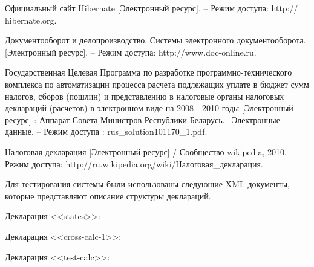 \documentclass[14pt,a4paper]{reportmod}
\begin{document}
\begin{thebibliography}{99}
 Официальный сайт Hibernate  [Электронный ресурс]. -- Режим доступа: http:// hibernate.org.

 Документооборот и делопроизводство. Системы электронного документооборота. [Электронный ресурс]. -- Режим доступа: http://www.doc-online.ru.

 Государственная Целевая Программа по разработке программно-технического комплекса по автоматизации процесса расчета подлежащих уплате в бюджет сумм налогов, сборов (пошлин) и представлению в налоговые органы налоговых деклараций (расчетов) в электронном виде на 2008 - 2010 годы [Электронный ресурс] : Аппарат Совета Министров Республики Беларусь.-- Электронные данные. -- Режим доступа : rus\_solution101170\_1.pdf.

 Налоговая декларация [Электронный ресурс] / Сообщество wikipedia, 2010. -- Режим доступа: http://ru.wikipedia.org/wiki/Налоговая\_декларация.

\end{thebibliography}

Для тестирования системы были использованы следующие XML документы, которые представляют описание структуры деклараций.

Декларация <<states>>:



Декларация <<cross-calc-1>>:



Декларация <<test-calc>>:

\end{document}
